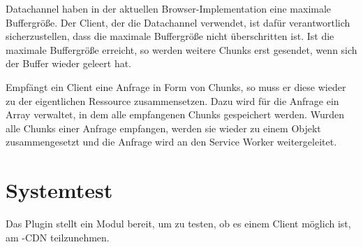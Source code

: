 Datachannel haben in der aktuellen Browser-Implementation eine maximale Buffergröße. Der Client, der die Datachannel verwendet, ist dafür verantwortlich sicherzustellen, dass die maximale Buffergröße nicht überschritten ist. Ist die maximale Buffergröße erreicht, so werden weitere Chunks erst gesendet, wenn sich der Buffer wieder geleert hat.

Empfängt ein Client eine Anfrage in Form von Chunks, so muss er diese wieder zu der eigentlichen Ressource zusammensetzen. Dazu wird für die Anfrage ein Array verwaltet, in dem alle empfangenen Chunks gespeichert werden. Wurden alle Chunks einer Anfrage empfangen, werden sie wieder zu einem Objekt zusammengesetzt und die Anfrage wird an den Service Worker weitergeleitet.




\section{Systemtest}\label{i:system-test}
Das Plugin stellt ein Modul bereit, um zu testen, ob es einem Client möglich ist, am \pTp-CDN teilzunehmen.

